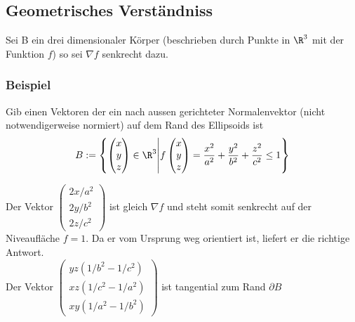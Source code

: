 \subsection{Geometrisches Verständniss}
Sei B ein drei dimensionaler Körper (beschrieben durch Punkte in $\R^3$ mit der Funktion $f$) so sei $\nabla f$ senkrecht dazu.

\subsubsection{Beispiel}
Gib einen Vektoren der ein nach aussen gerichteter Normalenvektor
(nicht notwendigerweise normiert) auf dem Rand des Ellipsoids ist \[
B := 
\left\{ 
	\begin{pmatrix} x\\ y\\ z \end{pmatrix} \in \R^3  
	\middle\vert
	f\begin{pmatrix} x\\ y\\ z \end{pmatrix} 
		= \frac{x^2}{a^2} + \frac{y^2}{b^2} + \frac{z^2}{c^2} \leq 1
\right\}
\]

Der Vektor $\begin{pmatrix} 2x/a^2\\ 2y/b^2\\ 2z/c^2 \end{pmatrix}$ ist gleich $\nabla f$ und steht somit 
senkrecht auf der Niveaufläche $f=1$. Da er vom Ursprung weg orientiert ist, liefert er die richtige Antwort.\\
Der Vektor $\begin{pmatrix} yz(1/b^2-1/c^2)\\ xz(1/c^2-1/a^2)\\ xy(1/a^2-1/b^2) \end{pmatrix}$ ist tangential 
zum Rand $\partial B$

